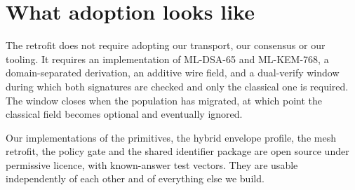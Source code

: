 \documentclass[11pt,a4paper]{article}
\begin{document}
\section{What adoption looks like}

The retrofit does not require adopting our transport, our consensus or our
tooling. It requires an implementation of ML-DSA-65 and ML-KEM-768, a
domain-separated derivation, an additive wire field, and a dual-verify window
during which both signatures are checked and only the classical one is required.
The window closes when the population has migrated, at which point the classical
field becomes optional and eventually ignored.

Our implementations of the primitives, the hybrid envelope profile, the mesh
retrofit, the policy gate and the shared identifier package are open source under
permissive licence, with known-answer test vectors. They are usable
independently of each other and of everything else we build.
\end{document}
